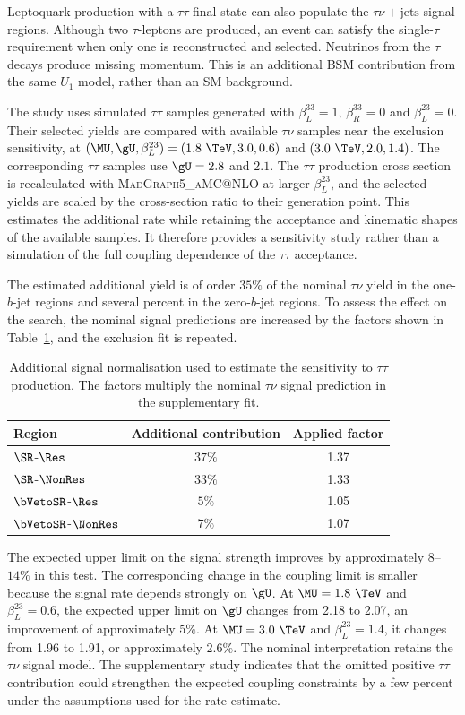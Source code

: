 Leptoquark production with a $\tau\tau$ final state can also populate the $\tau\nu+\mathrm{jets}$ signal regions.
Although two $\tau$-leptons are produced, an event can satisfy the single-$\tau$ requirement when only one is reconstructed and selected.
Neutrinos from the $\tau$ decays produce missing momentum.
This is an additional BSM contribution from the same $U_1$ model, rather than an SM background.

The study uses simulated $\tau\tau$ samples generated with $\beta_L^{33}=1$, $\beta_R^{33}=0$ and $\beta_L^{23}=0$.
Their selected yields are compared with available $\tau\nu$ samples near the exclusion sensitivity, at $(\MU,\gU,\beta_L^{23})=(1.8~\TeV,3.0,0.6)$ and $(3.0~\TeV,2.0,1.4)$.
The corresponding $\tau\tau$ samples use $\gU=2.8$ and $2.1$.
The $\tau\tau$ production cross section is recalculated with \textsc{MadGraph5\_aMC@NLO} at larger $\beta_L^{23}$, and the selected yields are scaled by the cross-section ratio to their generation point.
This estimates the additional rate while retaining the acceptance and kinematic shapes of the available samples.
It therefore provides a sensitivity study rather than a simulation of the full coupling dependence of the $\tau\tau$ acceptance.

The estimated additional yield is of order $35\%$ of the nominal $\tau\nu$ yield in the one-$b$-jet regions and several percent in the zero-$b$-jet regions.
To assess the effect on the search, the nominal signal predictions are increased by the factors shown in Table~\ref{tab:ch7_tautau_contamination}, and the exclusion fit is repeated.

\begin{table}[htbp]
    \centering
    \caption{Additional signal normalisation used to estimate the sensitivity to $\tau\tau$ production. The factors multiply the nominal $\tau\nu$ signal prediction in the supplementary fit.}
    \label{tab:ch7_tautau_contamination}
    \begin{tabular}{lcc}
        \toprule
        Region & Additional contribution & Applied factor \\
        \midrule
        $\SR$-$\Res$ & $37\%$ & 1.37 \\
        $\SR$-$\NonRes$ & $33\%$ & 1.33 \\
        $\bVetoSR$-$\Res$ & $5\%$ & 1.05 \\
        $\bVetoSR$-$\NonRes$ & $7\%$ & 1.07 \\
        \bottomrule
    \end{tabular}
\end{table}

The expected upper limit on the signal strength improves by approximately $8$--$14\%$ in this test.
The corresponding change in the coupling limit is smaller because the signal rate depends strongly on $\gU$.
At $\MU=1.8~\TeV$ and $\beta_L^{23}=0.6$, the expected upper limit on $\gU$ changes from 2.18 to 2.07, an improvement of approximately $5\%$.
At $\MU=3.0~\TeV$ and $\beta_L^{23}=1.4$, it changes from 1.96 to 1.91, or approximately $2.6\%$.
The nominal interpretation retains the $\tau\nu$ signal model.
The supplementary study indicates that the omitted positive $\tau\tau$ contribution could strengthen the expected coupling constraints by a few percent under the assumptions used for the rate estimate.
